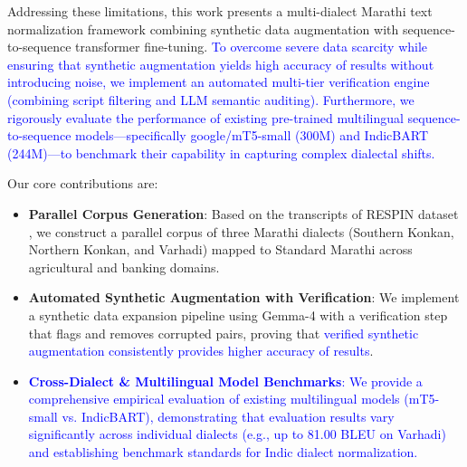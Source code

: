 Addressing these limitations, this work presents a multi-dialect Marathi text normalization framework combining synthetic data augmentation with sequence-to-sequence transformer fine-tuning.
\textcolor{blue}{To overcome severe data scarcity while ensuring that synthetic augmentation yields high accuracy of results without introducing noise, we implement an automated multi-tier verification engine (combining script filtering and LLM semantic auditing). Furthermore, we rigorously evaluate the performance of existing pre-trained multilingual sequence-to-sequence models—specifically google/mT5-small (300M) and IndicBART (244M)—to benchmark their capability in capturing complex dialectal shifts.}

Our core contributions are:
\begin{itemize}
    \item \textbf{Parallel Corpus Generation}: Based on the transcripts of RESPIN dataset \cite{kumar2025respin}, we construct a parallel corpus of three Marathi dialects (Southern Konkan, Northern Konkan, and Varhadi) mapped to Standard Marathi across agricultural and banking domains.
    \item \textbf{Automated Synthetic Augmentation with Verification}: We implement a synthetic data expansion pipeline using Gemma-4 \cite{gemma2024} with a verification step that flags and removes corrupted pairs, proving that \textcolor{blue}{verified synthetic augmentation consistently provides higher accuracy of results}.
    \item \textcolor{blue}{\textbf{Cross-Dialect \& Multilingual Model Benchmarks}: We provide a comprehensive empirical evaluation of existing multilingual models (mT5-small vs. IndicBART), demonstrating that evaluation results vary significantly across individual dialects (e.g., up to 81.00 BLEU on Varhadi) and establishing benchmark standards for Indic dialect normalization.}
\end{itemize}

